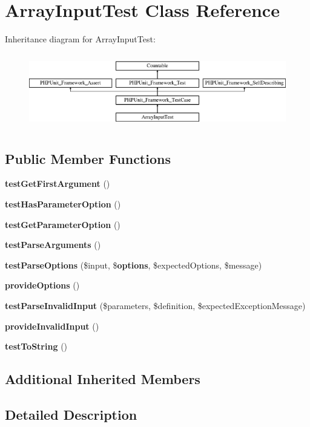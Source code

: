 \section{Array\+Input\+Test Class Reference}
\label{class_symfony_1_1_component_1_1_console_1_1_tests_1_1_input_1_1_array_input_test}
Inheritance diagram for Array\+Input\+Test\+:\begin{figure}[H]
\begin{center}
\leavevmode
\includegraphics[height=3.303835cm]{class_symfony_1_1_component_1_1_console_1_1_tests_1_1_input_1_1_array_input_test}
\end{center}
\end{figure}
\subsection*{Public Member Functions}
\begin{DoxyCompactItemize}
\item 
{\bf test\+Get\+First\+Argument} ()
\item 
{\bf test\+Has\+Parameter\+Option} ()
\item 
{\bf test\+Get\+Parameter\+Option} ()
\item 
{\bf test\+Parse\+Arguments} ()
\item 
{\bf test\+Parse\+Options} (\$input, \${\bf options}, \$expected\+Options, \$message)
\item 
{\bf provide\+Options} ()
\item 
{\bf test\+Parse\+Invalid\+Input} (\$parameters, \$definition, \$expected\+Exception\+Message)
\item 
{\bf provide\+Invalid\+Input} ()
\item 
{\bf test\+To\+String} ()
\end{DoxyCompactItemize}
\subsection*{Additional Inherited Members}


\subsection{Detailed Description}


